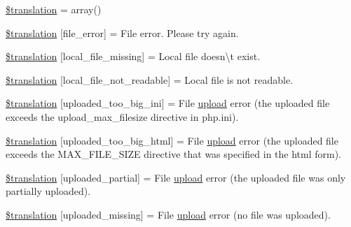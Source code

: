 \begin{DoxyCompactItemize}
\item 
\hyperlink{class_8upload_8xx___x_x_8php_a1f198d410fecc3871ebdd468d343a5e3}{\$translation} = array()
\item 
\hyperlink{class_8upload_8xx___x_x_8php_ac7498e49b9771b04698029aa61c70821}{\$translation} \mbox{[}\textquotesingle{}file\+\_\+error\textquotesingle{}\mbox{]} = \textquotesingle{}File error. Please try again.\textquotesingle{}
\item 
\hyperlink{class_8upload_8xx___x_x_8php_a6ec3d3a47ab70d77e7aa593e82ead10e}{\$translation} \mbox{[}\textquotesingle{}local\+\_\+file\+\_\+missing\textquotesingle{}\mbox{]} = \textquotesingle{}Local file doesn\textbackslash{}\textquotesingle{}t exist.\textquotesingle{}
\item 
\hyperlink{class_8upload_8xx___x_x_8php_a60104befef9b241f3a7a6a755618a4b3}{\$translation} \mbox{[}\textquotesingle{}local\+\_\+file\+\_\+not\+\_\+readable\textquotesingle{}\mbox{]} = \textquotesingle{}Local file is not readable.\textquotesingle{}
\item 
\hyperlink{class_8upload_8xx___x_x_8php_a6a08dcd0d3651fdd098568f6b2f0a42c}{\$translation} \mbox{[}\textquotesingle{}uploaded\+\_\+too\+\_\+big\+\_\+ini\textquotesingle{}\mbox{]} = \textquotesingle{}File \hyperlink{classupload}{upload} error (the uploaded file exceeds the upload\+\_\+max\+\_\+filesize directive in php.\+ini).\textquotesingle{}
\item 
\hyperlink{class_8upload_8xx___x_x_8php_a623d5b8b92169f57d7e43458aa911cbb}{\$translation} \mbox{[}\textquotesingle{}uploaded\+\_\+too\+\_\+big\+\_\+html\textquotesingle{}\mbox{]} = \textquotesingle{}File \hyperlink{classupload}{upload} error (the uploaded file exceeds the M\+A\+X\+\_\+\+F\+I\+L\+E\+\_\+\+S\+I\+Z\+E directive that was specified in the html form).\textquotesingle{}
\item 
\hyperlink{class_8upload_8xx___x_x_8php_a967c17da21b0a2d3bd65cca3a9ca0ea8}{\$translation} \mbox{[}\textquotesingle{}uploaded\+\_\+partial\textquotesingle{}\mbox{]} = \textquotesingle{}File \hyperlink{classupload}{upload} error (the uploaded file was only partially uploaded).\textquotesingle{}
\item 
\hyperlink{class_8upload_8xx___x_x_8php_a0cce433260be65f1f35853a6b4b8952b}{\$translation} \mbox{[}\textquotesingle{}uploaded\+\_\+missing\textquotesingle{}\mbox{]} = \textquotesingle{}File \hyperlink{classupload}{upload} error (no file was uploaded).\textquotesingle{}
\item 

\end{DoxyCompactItemize}
